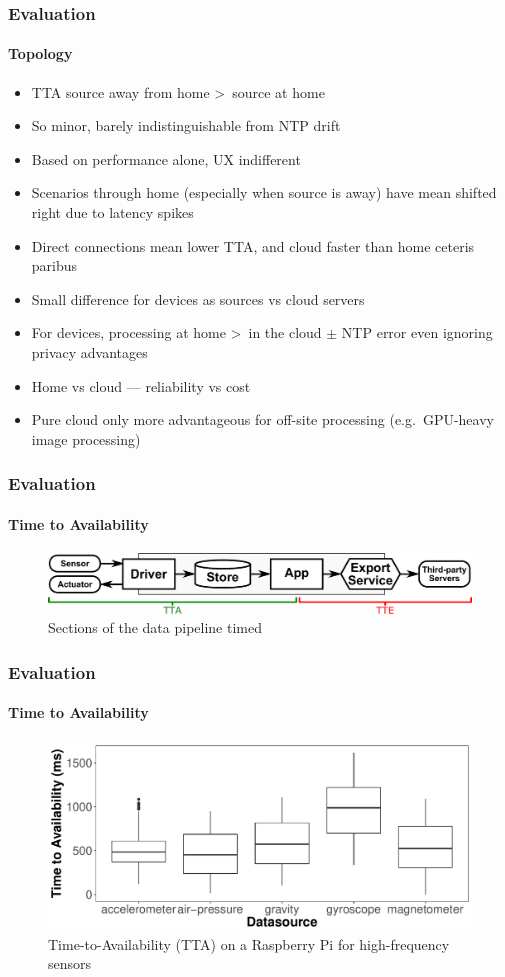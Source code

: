 \documentclass[aspectratio=169]{beamer}
\begin{document}
\begin{frame}
	\frametitle{Evaluation}
	\framesubtitle{Topology}

	\begin{itemize}
		\item TTA source away from home \textgreater \ source at home
		\item So minor, barely indistinguishable from NTP drift
		\item Based on performance alone, UX indifferent
		\item Scenarios through home (especially when source is away) have mean shifted right due to latency spikes
		\item Direct connections mean lower TTA, and cloud faster than home ceteris paribus
		\item Small difference for devices as sources vs cloud servers
		\item For devices, processing at home \textgreater \ in the cloud $\pm$ NTP error even ignoring privacy advantages
		\item Home vs cloud --- reliability vs cost
		\item Pure cloud only more advantageous for off-site processing (e.g.\ GPU-heavy image processing)
	\end{itemize}
\end{frame}

\begin{frame}
	\frametitle{Evaluation}
	\framesubtitle{Time to Availability}

	\begin{figure}
		\centering
		\includegraphics[width=\linewidth]{tta-tte.pdf}
		\caption{Sections of the data pipeline timed}
	\end{figure}
\end{frame}

\begin{frame}
	\frametitle{Evaluation}
	\framesubtitle{Time to Availability}

	\begin{figure}
		\centering
		\includegraphics[width=0.8\linewidth]{source-tta-rpi.pdf}
		\caption{Time-to-Availability (TTA) on a Raspberry Pi for high-frequency sensors}
	\end{figure}
\end{frame}
\end{document}
